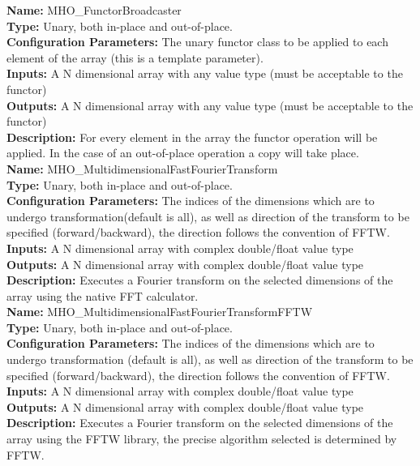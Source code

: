 \noindent \textbf{Name:}  MHO\_FunctorBroadcaster \\
\textbf{Type:} Unary, both in-place and out-of-place. \\
\textbf{Configuration Parameters:} The unary functor class to be applied to each element of the array (this is a template parameter).\\
\textbf{Inputs:} A N dimensional array with any value type (must be acceptable to the functor)\\
\textbf{Outputs:} A N dimensional array with any value type (must be acceptable to the functor)\\
\textbf{Description:} For every element in the array the functor operation will be applied. In the case of an out-of-place operation a copy will take place.\\


\noindent \textbf{Name:} MHO\_MultidimensionalFastFourierTransform \\
\textbf{Type:} Unary, both in-place and out-of-place. \\
\textbf{Configuration Parameters:} The indices of the dimensions which are to undergo transformation(default is all), as well as direction of the transform to be specified (forward/backward), the direction follows the convention of FFTW.\\
\textbf{Inputs:} A N dimensional array with complex double/float value type \\
\textbf{Outputs:} A N dimensional array with complex double/float value type \\
\textbf{Description:} Executes a Fourier transform on the selected dimensions of the array using the native FFT calculator.\\


\noindent \textbf{Name:} MHO\_MultidimensionalFastFourierTransformFFTW \\
\textbf{Type:} Unary, both in-place and out-of-place. \\
\textbf{Configuration Parameters:} The indices of the dimensions which are to undergo transformation (default is all), as well as direction of the transform to be specified (forward/backward), the direction follows the convention of FFTW.\\
\textbf{Inputs:} A N dimensional array with complex double/float value type \\
\textbf{Outputs:} A N dimensional array with complex double/float value type \\
\textbf{Description:} Executes a Fourier transform on the selected dimensions of the array using the FFTW library, the precise algorithm selected is determined by FFTW.\\


